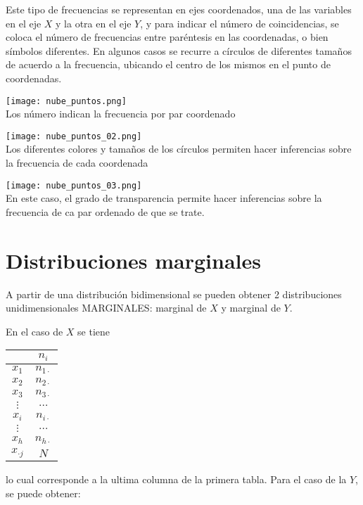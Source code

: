 \documentclass[11 pts, letterpaper, twosided]{article}
\begin{document}
Este tipo de frecuencias se representan en ejes coordenados, una de
las variables en el eje $X$ y la otra en el eje $Y$, y para indicar el
número de coincidencias, se coloca el número de frecuencias entre
paréntesis en las coordenadas, o bien símbolos diferentes. En algunos
casos se recurre a círculos de diferentes tamaños de acuerdo a la
frecuencia, ubicando el centro de los mismos en el punto de
coordenadas.

\begin{center}
    \texttt{[image: nube\_puntos.png]}\\
    Los número indican la frecuencia por par coordenado
\end{center}

\begin{center}
    \texttt{[image: nube\_puntos\_02.png]}\\
Los diferentes colores y tamaños de los círculos permiten hacer inferencias sobre la frecuencia de cada coordenada
\end{center}

\begin{center}
    \texttt{[image: nube\_puntos\_03.png]}\\
    En este caso, el grado de transparencia permite hacer inferencias sobre la frecuencia de ca par ordenado de que se trate.
\end{center}

\section{Distribuciones marginales}

A partir de una distribución bidimensional se pueden obtener 2
distribuciones unidimensionales MARGINALES: marginal de $X$ y marginal
de $Y$. 

En el caso de $X$ se tiene

\begin{center}
    \begin{tabular}[c]{|c||c|}
      \hline
      \qquad & $n_i$\\
      \hline
      \hline
      $x_1$  & $n_{1\cdot}$\\
      \hline
      $x_2$  & $n_{2\cdot}$\\
      \hline
      $x_3$  & $n_{3\cdot}$\\
      \hline
      $\vdots$ & $\dots$\\
      \hline
      $x_i$  & $n_{i\cdot}$\\
      \hline
      $\vdots$  & $\dots$\\
      \hline
      $x_h$  & $n_{h\cdot}$\\
      \hline
      \hline
      $x_{\cdot j}$  & $N$\\
      \hline
    \end{tabular}
\end{center}

lo cual corresponde a la ultima columna de la primera tabla. Para el caso de la $Y$, se puede obtener:

\end{document}
